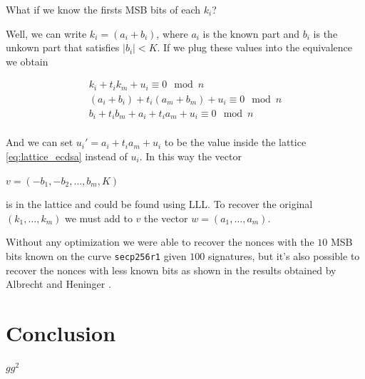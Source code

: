 \documentclass[a4paper,12pt]{report}
\begin{document}
What if we know the firsts MSB bits of each $k_i$?

Well, we can write $k_i = (a_i + b_i)$, where $a_i$ is the known part and $b_i$ is the unkown part that satisfies $|b_i| < K$. If we plug these values
into the equivalence we obtain

\[
    \begin{array}{c}
        k_i + t_ik_m + u_i \equiv 0 \mod n \\
        (a_i + b_i) + t_i(a_m + b_m) + u_i \equiv 0 \mod n \\
        b_i + t_ib_m + a_i + t_ia_m + u_i \equiv 0 \mod n \\
    \end{array}
\]

And we can set $u_i' = a_i + t_ia_m + u_i$ to be the value inside the lattice \ref{eq:lattice_ecdsa} instead of $u_i$. In this way the vector

\begin{center}
    $v = (-b_1, -b_2, \ldots, b_m, K)$
\end{center}

is in the lattice and could be found using LLL. To recover the original $(k_1, \ldots, k_m)$ we must add to $v$ the vector $w = (a_1, \ldots, a_m)$.

Without any optimization we were able to recover the nonces with the $10$ MSB bits known on the curve \texttt{secp256r1} given $100$ signatures,
but it's also possible to recover the nonces with less known bits as shown in the results obtained by Albrecht and Heninger \cite{ecdsa_result}.

\chapter*{Conclusion}

$gg^2$



\end{document}
